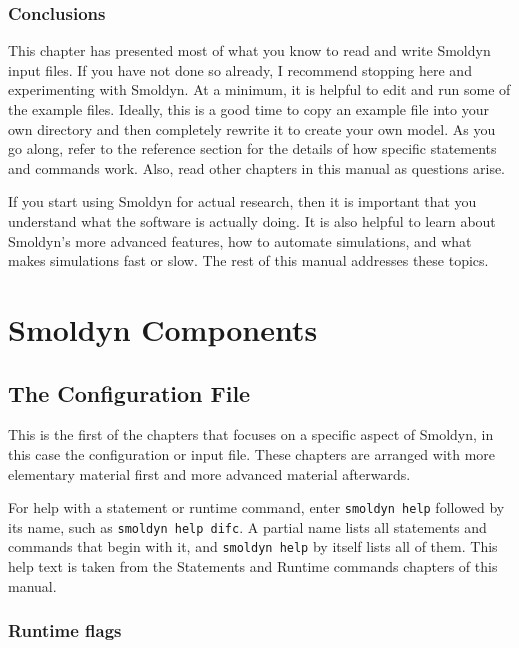 \documentclass {scrbook}
\newcommand {\ttt} {\texttt}
\begin{document}
\section{Conclusions}

This chapter has presented most of what you know to read and write Smoldyn input files. If you have not done so already, I recommend stopping here and experimenting with Smoldyn. At a minimum, it is helpful to edit and run some of the example files. Ideally, this is a good time to copy an example file into your own directory and then completely rewrite it to create your own model. As you go along, refer to the reference section for the details of how specific statements and commands work. Also, read other chapters in this manual as questions arise.

If you start using Smoldyn for actual research, then it is important that you understand what the software is actually doing. It is also helpful to learn about Smoldyn's more advanced features, how to automate simulations, and what makes simulations fast or slow. The rest of this manual addresses these topics.

\part{Smoldyn Components}

\chapter{The Configuration File}

This is the first of the chapters that focuses on a specific aspect of Smoldyn, in this case the configuration or input file. These chapters are arranged with more elementary material first and more advanced material afterwards.

For help with a statement or runtime command, enter \ttt{smoldyn help} followed by its name, such as \ttt{smoldyn help difc}. A partial name lists all statements and commands that begin with it, and \ttt{smoldyn help} by itself lists all of them. This help text is taken from the Statements and Runtime commands chapters of this manual.

\section{Runtime flags}
\end{document}
